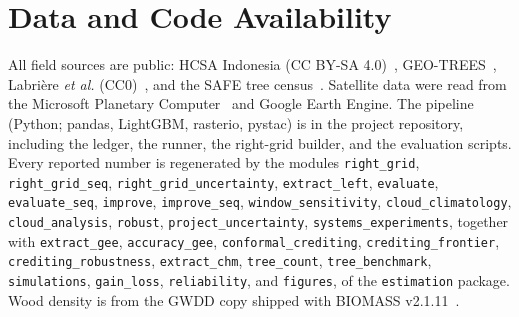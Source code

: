 \documentclass[conference,a4paper]{IEEEtran}
\begin{document}
\clearpage
\section*{Data and Code Availability}
All field sources are public: HCSA Indonesia (CC BY-SA 4.0)~\cite{hcsa2023data}, GEO-TREES~\cite{geotrees2024}, Labri\`ere \textit{et al.} (CC0)~\cite{labriere2018insitu}, and the SAFE tree census~\cite{svatek2025safe}. Satellite data were read from the Microsoft Planetary Computer~\cite{mpc2022} and Google Earth Engine. The pipeline (Python; pandas, LightGBM, rasterio, pystac) is in the project repository, including the ledger, the runner, the right-grid builder, and the evaluation scripts. Every reported number is regenerated by the modules \texttt{right\_grid}, \texttt{right\_grid\_seq}, \texttt{right\_grid\_uncertainty}, \texttt{extract\_left}, \texttt{evaluate}, \texttt{evaluate\_seq}, \texttt{improve}, \texttt{improve\_seq}, \texttt{window\_sensitivity}, \texttt{cloud\_climatology}, \texttt{cloud\_analysis}, \texttt{robust}, \texttt{project\_uncertainty}, \texttt{systems\_experiments}, together with \texttt{extract\_gee}, \texttt{accuracy\_gee}, \texttt{conformal\_crediting}, \texttt{crediting\_frontier}, \texttt{crediting\_robustness}, \texttt{extract\_chm}, \texttt{tree\_count}, \texttt{tree\_benchmark}, \texttt{simulations}, \texttt{gain\_loss}, \texttt{reliability}, and \texttt{figures}, of the \texttt{estimation} package. Wood density is from the GWDD copy shipped with BIOMASS v2.1.11~\cite{rejou2017biomass}.
\end{document}
